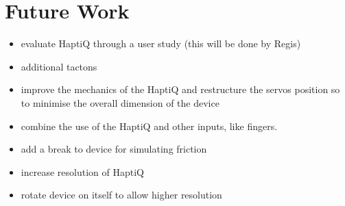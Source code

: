 \chapter{Future Work}
\label{chap:futureWork}

\begin{itemize}
	\item evaluate HaptiQ through a user study (this will be done by Regis)
	\item additional tactons
    \item improve the mechanics of the HaptiQ and restructure the servos position so to minimise the overall dimension of the device
    \item combine the use of the HaptiQ and other inputs, like fingers. 
    \item add a break to device for simulating friction
    \item increase resolution of HaptiQ
    \item rotate device on itself to allow higher resolution
\end{itemize}